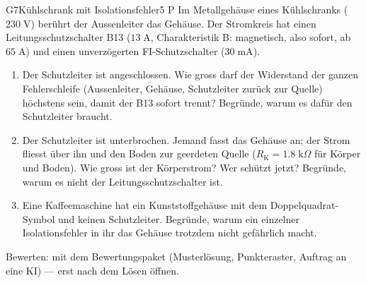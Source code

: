\documentclass[11pt]{article}
\begin{document}
\begin{lpaufgabe}{G7}{Kühlschrank mit Isolationsfehler}{5 P}
Im Metallgehäuse eines Kühlschranks ($230\;\text{V}$) berührt der Aussenleiter das Gehäuse. Der Stromkreis hat einen
Leitungsschutzschalter B13 ($13\;\text{A}$, Charakteristik B: magnetisch, also sofort, ab $65\;\text{A}$) und einen unverzögerten FI-Schutzschalter ($30\;\text{mA}$).
\begin{enumerate}[label=\alph*),leftmargin=*,itemsep=2pt,topsep=2pt]
\item Der Schutzleiter ist angeschlossen. Wie gross darf der Widerstand der ganzen Fehlerschleife (Aussenleiter, Gehäuse, Schutzleiter zurück zur Quelle) höchstens sein, damit der B13 sofort trennt? Begründe, warum es dafür den Schutzleiter braucht.
\item Der Schutzleiter ist unterbrochen. Jemand fasst das Gehäuse an; der Strom fliesst über ihn und den Boden zur geerdeten Quelle ($R_\text{K} = 1.8\;\text{k}\Omega$ für Körper und Boden). Wie gross ist der Körperstrom? Wer schützt jetzt? Begründe, warum es nicht der Leitungsschutzschalter ist.
\item Eine Kaffeemaschine hat ein Kunststoffgehäuse mit dem Doppelquadrat-Symbol und keinen Schutzleiter. Begründe, warum ein einzelner Isolationsfehler in ihr das Gehäuse trotzdem nicht gefährlich macht.
\end{enumerate}
\end{lpaufgabe}

\vfill
{\small\color{lpgrau}Bewerten: mit dem Bewertungspaket (Musterlösung, Punkteraster, Auftrag an eine KI) — erst nach dem Lösen öffnen.}
\end{document}
